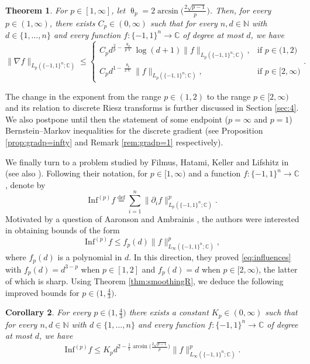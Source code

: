 \documentclass[11pt,reqno]{amsart}
\renewcommand{\leq}{\leqslant}
\renewcommand{\pi}{\uppi}
\newcommand{\1}{\mathbf 1}
\newtheorem{theorem}{Theorem}
\newtheorem{corollary}[theorem]{Corollary}
\theoremstyle{remark}
\newcommand{\C}{\mathbb C}
\newcommand{\N}{\mathbb N}
\newcommand{\eqdef}{\stackrel{\mathrm{def}}{=}}
\renewcommand{\theta}{\uptheta}
\renewcommand{\pi}{\uppi}
\renewcommand{\pi}{\uppi}
\begin{document}
\begin{theorem} \label{thm:gradR}
For $p\in[1,\infty]$, let $\theta_p = 2\arcsin\big(\frac{2\sqrt{p-1}}{p}\big)$. Then, for every $p\in(1,\infty)$, there exists $C_p\in(0,\infty)$ such that for every $n,d\in\N$ with $d\in\{1,\ldots,n\}$ and every function $f:\{-1,1\}^n\to\C$ of degree at most $d$, we have
\begin{equation}
\|\nabla f\|_{L_p(\{-1,1\}^n;\C)} \leq   \begin{cases} 
C_p d^{\frac{2}{p}-\frac{\theta_p}{p\pi}} \log (d+1) \|f\|_{L_p(\{-1,1\}^n;\C)}, & \mbox{if } p\in\big(1,2\big)
\\ C_pd^{1-\frac{\theta_p}{2\pi}} \|f\|_{L_p(\{-1,1\}^n;\C)}, & \mbox{if } p\in[2,\infty) \end{cases}.
\end{equation}
\end{theorem}

The change in the exponent from the range $p\in(1,2)$ to the range $p\in[2,\infty)$ and its relation to discrete Riesz transforms is further discussed in Section \ref{sec:4}. We also postpone until then the statement of some endpoint ($p=\infty$ and $p=1$) Bernstein--Markov inequalities for the discrete gradient (see Proposition \ref{prop:gradp=infty} and Remark \ref{rem:gradp=1} respectively).

We finally turn to a problem studied by Filmus, Hatami, Keller and Lifshitz in \cite{FHKL16} (see also \cite{BB14}). Following their notation, for $p\in[1,\infty)$ and a function $f:\{-1,1\}^n\to\C$, denote by
\begin{equation}
\mathrm{Inf}^{(p)} f \eqdef \sum_{i=1}^n \|\partial_i f\|^p_{L_p(\{-1,1\}^n;\C)}.
\end{equation}
Motivated by a question of Aaronson and Ambrainis \cite{AA14}, the authors were interested in obtaining bounds of the form 
\begin{equation} \label{eq:influences}
\mathrm{Inf}^{(p)} f \leq f_p(d) \|f\|_{L_\infty(\{-1,1\}^n;\C)}^p,
\end{equation}
where $f_p(d)$ is a polynomial in $d$. In this direction, they proved \eqref{eq:influences} with $f_p(d) = d^{3-p}$ when $p\in[1,2]$ and $f_p(d)=d$ when $p\in[2,\infty)$, the latter of which is sharp. Using Theorem \ref{thm:smoothingR}, we deduce the following improved bounds for $p\in\big(1,\frac{4}{3}\big)$.

\begin{corollary} \label{cor:influences}
For every $p\in\big(1,\frac{4}{3}\big)$ there exists a constant $K_p\in(0,\infty)$ such that for every $n,d\in\N$ with $d\in\{1,\ldots,n\}$ and every function $f:\{-1,1\}^n\to\C$ of degree at most $d$, we have
\begin{equation} \label{eq:influencebound}
\mathrm{Inf}^{(p)} f \leq K_pd^{2-\frac{1}{\pi}\arcsin\big(\frac{2\sqrt{p-1}}{p}\big)} \|f\|_{L_\infty(\{-1,1\}^n;\C)}^p.
\end{equation}
\end{corollary}
\end{document}
